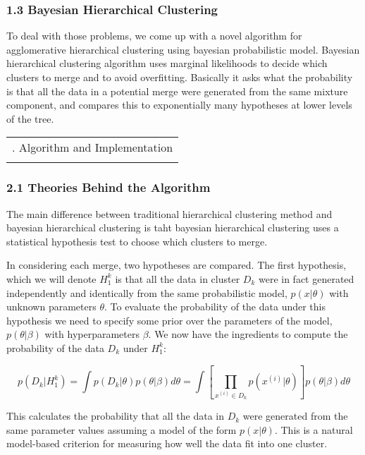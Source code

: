 \documentclass{article}
\begin{document}
\subsubsection{1.3 Bayesian Hierarchical
Clustering}\label{bayesian-hierarchical-clustering}

To deal with those problems, we come up with a novel algorithm for
agglomerative hierarchical clustering using bayesian probabilistic
model. Bayesian hierarchical clustering algorithm uses marginal
likelihoods to decide which clusters to merge and to avoid overﬁtting.
Basically it asks what the probability is that all the data in a
potential merge were generated from the same mixture component, and
compares this to exponentially many hypotheses at lower levels of the
tree.

    \begin{longtable}[c]{@{}l@{}}
\toprule\addlinespace
2. Algorithm and Implementation
\\\addlinespace
\bottomrule
\end{longtable}

\subsubsection{2.1 Theories Behind the
Algorithm}\label{theories-behind-the-algorithm}

The main diﬀerence between traditional hierarchical clustering method
and bayesian hierarchical clustering is taht bayesian hierarchical
clustering uses a statistical hypothesis test to choose which clusters
to merge.

In considering each merge, two hypotheses are compared. The ﬁrst
hypothesis, which we will denote $H_1^k$ is that all the data in cluster
$D_k$ were in fact generated independently and identically from the same
probabilistic model, $p(x|θ)$ with unknown parameters $\theta$. To
evaluate the probability of the data under this hypothesis we need to
specify some prior over the parameters of the model, $p(\theta|\beta)$
with hyperparameters $\beta$. We now have the ingredients to compute the
probability of the data $D_k$ under $H_1^k$:

\[p(D_k|H_1^k)= \int{p(D_k|\theta)p(\theta|\beta) d\theta}=\int{[\prod_{x^{(i)}\in D_k}p(x^{(i)}|\theta)]p(\theta|\beta) d\theta} \]

This calculates the probability that all the data in $D_k$ were
generated from the same parameter values assuming a model of the form
$p(x|\theta)$. This is a natural model-based criterion for measuring how
well the data ﬁt into one cluster.
\end{document}
